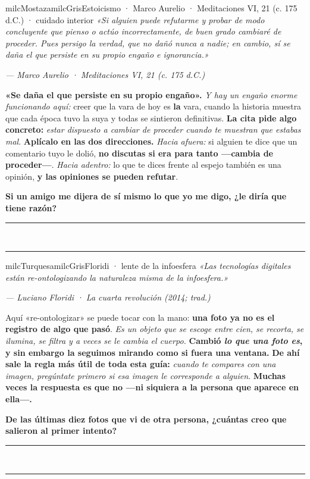 \documentclass[11pt,letterpaper]{article}
\newcommand{\linead}[1]{\noindent\color{milcLinea}\rule{#1}{0.5pt}\color{milcNegro}}
\begin{document}
\begin{softbox}{milcMostaza}{milcGris}{Estoicismo · Marco Aurelio · Meditaciones VI, 21 (c. 175 d.C.) · cuidado interior}
\textit{«Si alguien puede refutarme y probar de modo concluyente que pienso o actúo incorrectamente, de buen grado cambiaré de proceder. Pues persigo la verdad, que no dañó nunca a nadie; en cambio, sí se daña el que persiste en su propio engaño e ignorancia.»}

{\footnotesize\itshape\color{milcNegro!70}--- Marco Aurelio · Meditaciones VI, 21 (c. 175 d.C.)}

\textbf{«Se daña el que persiste en su propio engaño».} \emph{Y hay un engaño enorme funcionando aquí:} creer que la vara de hoy es \textbf{la} vara, cuando la historia muestra que cada época tuvo la suya y todas se sintieron definitivas. \textbf{La cita pide algo concreto:} \emph{estar dispuesto a cambiar de proceder cuando te muestran que estabas mal}. \textbf{Aplícalo en las dos direcciones.} \emph{Hacia afuera:} si alguien te dice que un comentario tuyo le dolió, \textbf{no discutas si era para tanto ---cambia de proceder---}. \emph{Hacia adentro:} lo que te dices frente al espejo también es una opinión, \textbf{y las opiniones se pueden refutar}.

\textbf{Si un amigo me dijera de sí mismo lo que yo me digo, ¿le diría que tiene razón?}
\end{softbox}
\linead{\linewidth}\\[1mm]
\linead{\linewidth}

\begin{softbox}{milcTurquesa}{milcGris}{Floridi · lente de la infoesfera}
\textit{«Las tecnologías digitales están re-ontologizando la naturaleza misma de la infoesfera.»}

{\footnotesize\itshape\color{milcNegro!70}--- Luciano Floridi · La cuarta revolución (2014; trad.)}

Aquí «re-ontologizar» se puede tocar con la mano: \textbf{una foto ya no es el registro de algo que pasó}. \emph{Es un objeto que se escoge entre cien, se recorta, se ilumina, se filtra y a veces se le cambia el cuerpo.} \textbf{Cambió \emph{lo que una foto es}, y sin embargo la seguimos mirando como si fuera una ventana.} \textbf{De ahí sale la regla más útil de toda esta guía:} \emph{cuando te compares con una imagen, pregúntate primero si esa imagen le corresponde a alguien}. \textbf{Muchas veces la respuesta es que no ---ni siquiera a la persona que aparece en ella---.}

\textbf{De las últimas diez fotos que vi de otra persona, ¿cuántas creo que salieron al primer intento?}
\end{softbox}
\linead{\linewidth}\\[1mm]
\linead{\linewidth}
\end{document}
